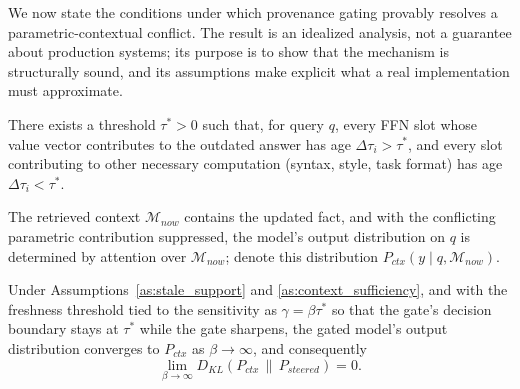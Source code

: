 \documentclass[manuscript, screen, review]{jair}
\begin{document}
We now state the conditions under which provenance gating provably resolves a parametric-contextual conflict. The result is an idealized analysis, not a guarantee about production systems; its purpose is to show that the mechanism is structurally sound, and its assumptions make explicit what a real implementation must approximate.

\begin{assumption}
\label{as:stale_support}
There exists a threshold $\tau^{\ast} > 0$ such that, for query $q$, every FFN slot whose value vector contributes to the outdated answer has age $\Delta\tau_i > \tau^{\ast}$, and every slot contributing to other necessary computation (syntax, style, task format) has age $\Delta\tau_i < \tau^{\ast}$.
\end{assumption}

\begin{assumption}
\label{as:context_sufficiency}
The retrieved context $\mathcal{M}_{now}$ contains the updated fact, and with the conflicting parametric contribution suppressed, the model's output distribution on $q$ is determined by attention over $\mathcal{M}_{now}$; denote this distribution $P_{ctx}(y \mid q, \mathcal{M}_{now})$.
\end{assumption}

\begin{proposition}
\label{prop:consistency}
Under Assumptions~\ref{as:stale_support} and \ref{as:context_sufficiency}, and with the freshness threshold tied to the sensitivity as $\gamma = \beta\tau^{\ast}$ so that the gate's decision boundary stays at $\tau^{\ast}$ while the gate sharpens, the gated model's output distribution converges to $P_{ctx}$ as $\beta \to \infty$, and consequently
\begin{equation}
  \lim_{\beta \to \infty} D_{KL}\!\left( P_{ctx} \,\|\, P_{steered} \right) = 0.
\end{equation}
\end{proposition}
\end{document}
